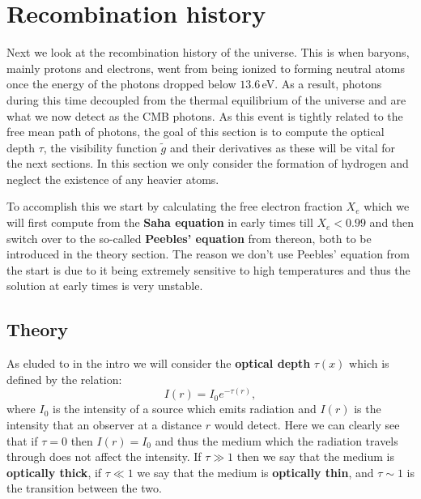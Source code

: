 \documentclass[%
reprint,
 amsmath,amssymb,
 aps,
]{revtex4-2}
\begin{document}
\section{Recombination history}
\label{sec:2}
Next we look at the recombination history of the universe. This is when baryons, mainly protons and electrons, went from being ionized to forming neutral atoms once the energy of the photons dropped below $13.6\,$eV. As a result, photons during this time decoupled from the thermal equilibrium of the universe and are what we now detect as the CMB photons. As this event is tightly related to the free mean path of photons, the goal of this section is to compute the optical depth $\tau$, the visibility function $\tilde g$ and their derivatives as these will be vital for the next sections. In this section we only consider the formation of hydrogen and neglect the existence of any heavier atoms.

To accomplish this we start by calculating the free electron fraction $X_e$ which we will first compute from the \textbf{Saha equation} in early times till $X_e<0.99$ and then switch over to the so-called \textbf{Peebles' equation} from thereon, both to be introduced in the theory section. The reason we don't use Peebles' equation from the start is due to it being extremely sensitive to high temperatures and thus the solution at early times is very unstable.

\subsection{Theory}
As eluded to in the intro we will consider the \textbf{optical depth} $\tau(x)$ which is defined by the relation:
\begin{equation}
	I(r)=I_0e^{-\tau(r)},\label{eq:intensity}
\end{equation}
where $I_0$ is the intensity of a source which emits radiation and $I(r)$ is the intensity that an observer at a distance $r$ would detect. Here we can clearly see that if $\tau=0$ then $I(r)=I_0$ and thus the medium which the radiation travels through does not affect the intensity. If $\tau\gg1$ then we say that the medium is \textbf{optically thick}, if $\tau\ll1$ we say that the medium is \textbf{optically thin}, and $\tau\sim1$ is the transition between the two.
\end{document}
